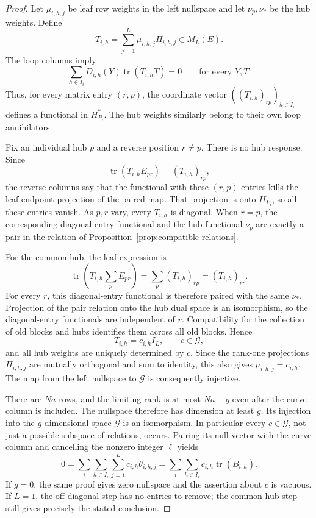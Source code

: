\documentclass[11pt]{article}
\theoremstyle{definition}
\theoremstyle{remark}
\numberwithin{equation}{section}
\begin{document}
\begin{proof}
Let \(\mu_{i,h,j}\) be leaf row weights in the left nullspace
and let \(\nu_p,\nu_*\) be the hub weights. Define
\[
 T_{i,h}=\sum_{j=1}^L\mu_{i,h,j}\Pi_{i,h,j}\in M_L(E).
\]
The loop columns imply
\[
 \sum_{h\in I_i}D_{i,h}(Y)
          \operatorname{tr}(T_{i,h}T)=0
 \qquad\text{for every }Y,T.
\]
Thus, for every matrix entry \((r,p)\), the coordinate vector
\( ((T_{i,h})_{rp})_{h\in I_i}\) defines a functional in
\(H_{P_i}^*\). The hub weights similarly belong to their own
loop annihilators.

Fix an individual hub \(p\) and a reverse position \(r\ne p\).
There is no hub response. Since
\[
 \operatorname{tr}(T_{i,h}E_{pr})=(T_{i,h})_{rp},
\]
the reverse columns say that the functional with these
\((r,p)\)-entries kills the leaf endpoint projection of the paired
map. That projection is onto \(H_{P_i}\), so all these entries
vanish. As \(p,r\) vary, every \(T_{i,h}\) is diagonal. When
\(r=p\), the corresponding diagonal-entry functional and the
hub functional \(\nu_p\) are exactly a pair in the relation of
Proposition~\ref{prop:compatible-relations}.

For the common hub, the leaf expression is
\[
 \operatorname{tr}\left(T_{i,h}\sum_pE_{pr}\right)
   =\sum_p(T_{i,h})_{rp}=(T_{i,h})_{rr}.
\]
For every \(r\), this diagonal-entry functional is therefore
paired with the same \(\nu_*\). Projection of the pair relation
onto the hub dual space is an isomorphism, so the diagonal-entry
functionals are independent of \(r\). Compatibility for the
collection of old blocks and hubs identifies them across all old
blocks. Hence
\[
 T_{i,h}=c_{i,h}I_L,
 \qquad c\in\mathcal G,
\]
and all hub weights are uniquely determined by \(c\). Since the
rank-one projections \(\Pi_{i,h,j}\) are mutually orthogonal
and sum to identity, this also gives
\(\mu_{i,h,j}=c_{i,h}\). The map from the left nullspace to
\(\mathcal G\) is consequently injective.

There are \(Na\) rows, and the limiting rank is at most \(Na-g\)
even after the curve column is included. The nullspace therefore
has dimension at least \(g\). Its injection into the
\(g\)-dimensional space \(\mathcal G\) is an isomorphism.
In particular every \(c\in\mathcal G\), not just a possible
subspace of relations, occurs. Pairing its null vector with the
curve column and cancelling the nonzero integer \(\ell\) yields
\[
 0=\sum_i\sum_{h\in I_i}\sum_{j=1}^L
       c_{i,h}\theta_{i,h,j}
  =\sum_i\sum_{h\in I_i}c_{i,h}\operatorname{tr}(B_{i,h}).
\]
If \(g=0\), the same proof gives zero nullspace and the assertion
about \(c\) is vacuous. If \(L=1\), the off-diagonal step has
no entries to remove; the common-hub step still gives precisely
the stated conclusion.
\end{proof}
\end{document}
